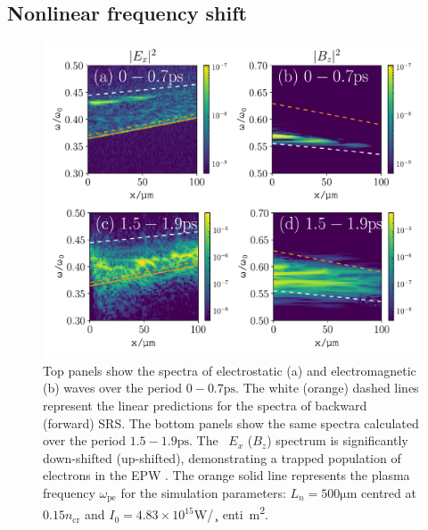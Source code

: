 \subsection{Nonlinear frequency shift}
\begin{figure}[h!]
    \centering
    \includegraphics[width=0.9\columnwidth]{Chapters/C4_iSRS/fig4_4a_4b_4c_4d.pdf}
    \caption{Top panels show the spectra of electrostatic (a) and electromagnetic (b) waves over the period $0-0.7\si{\pico\second}$.
    The white (orange) dashed lines represent the linear predictions for the spectra of backward (forward) SRS. The bottom panels show the same spectra calculated over the period $1.5-1.9\si{\pico\second}$. The \
$E_x$ ($B_z$)
    spectrum is significantly down-shifted (up-shifted), demonstrating a trapped population of electrons in the EPW \cite{Yin2006}.
    The orange solid line represents the plasma frequency $\omega_{\mathrm{pe}}$ for the simulation parameters: $L_n = 500 \si{\micro\metre} $ centred at $0.15n_\mathrm{cr}$ and $I_0 = 4.83\times10^{15}$\si{W/\c\
enti\metre^2}.}
    \label{fig:downshift}
\end{figure}{}


